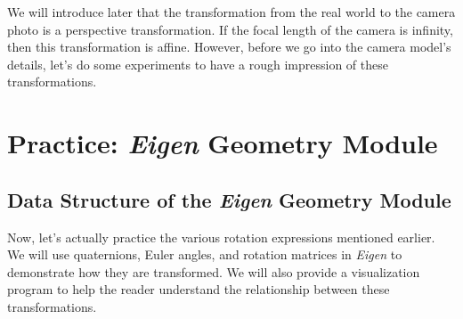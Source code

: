 We will introduce later that the transformation from the real world to the camera photo is a perspective transformation. If the focal length of the camera is infinity, then this transformation is affine. However, before we go into the camera model's details, let's do some experiments to have a rough impression of these transformations.

\section{Practice: \textit{Eigen} Geometry Module}
\subsection{Data Structure of the \textit{Eigen} Geometry Module}
Now, let's actually practice the various rotation expressions mentioned earlier. We will use quaternions, Euler angles, and rotation matrices in \textit{Eigen} to demonstrate how they are transformed. We will also provide a visualization program to help the reader understand the relationship between these transformations.

